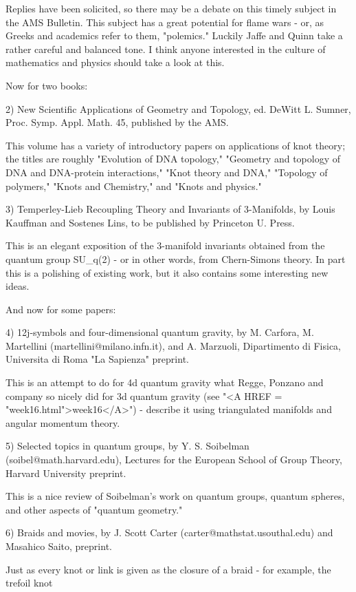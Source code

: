 Replies have been solicited, so there may be a debate on this timely
subject in the AMS Bulletin.  This subject has a great potential for
flame wars - or, as Greeks and academics refer to them, "polemics."  Luckily
Jaffe and Quinn take a rather careful and balanced tone.   I think
anyone interested in the culture of mathematics and physics should take
a look at this.

Now for two books:

2) New Scientific Applications of Geometry and Topology, ed. DeWitt L.
Sumner, Proc. Symp. Appl. Math. 45, published by the AMS.

This volume has a variety of introductory papers on applications of knot
theory; the titles are roughly "Evolution of DNA topology," "Geometry
and topology of DNA and DNA-protein interactions," "Knot theory and
DNA," "Topology of polymers," "Knots and Chemistry," and "Knots and
physics."  

3) Temperley-Lieb Recoupling Theory and Invariants of 3-Manifolds, by
Louis Kauffman and Sostenes Lins, to be published by Princeton U. Press.

This is an elegant exposition of the 3-manifold invariants obtained from the
quantum group SU_q(2) - or in other words, from Chern-Simons theory.  In
part this is a polishing of existing work, but it also contains some
interesting new ideas.

And now for some papers:

4) 12j-symbols and four-dimensional quantum gravity, by M. Carfora, M.
Martellini (martellini@milano.infn.it), and A. Marzuoli, Dipartimento di
Fisica, Universita di Roma "La Sapienza" preprint.

This is an attempt to do for 4d quantum gravity what Regge, Ponzano and
company so nicely did for 3d quantum gravity (see "<A HREF = "week16.html">week16</A>") - describe
it using triangulated manifolds and angular momentum theory.

5) Selected topics in quantum groups, by Y. S. Soibelman
(soibel@math.harvard.edu), Lectures for the European School of Group
Theory, Harvard University preprint.

This is a nice review of Soibelman's work on quantum groups, quantum
spheres, and other aspects of "quantum geometry."

6) Braids and movies, by J. Scott Carter (carter@mathstat.usouthal.edu)
and Masahico Saito, preprint. 

Just as every knot or link is given as the closure of a braid - for
example, the trefoil knot 


